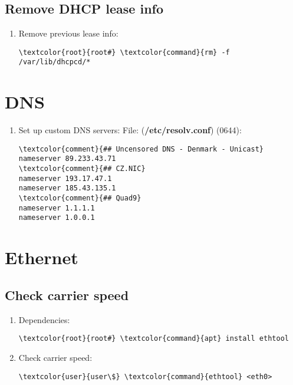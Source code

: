 \documentclass[10pt, a4paper, onecolumn, openany]{book} %
\begin{document}
\subsection{Remove DHCP lease info}
\begin{enumerate}
    \item Remove previous lease info:
\begin{Verbatim}[commandchars=\\\{\}]
\textcolor{root}{root#} \textcolor{command}{rm} -f /var/lib/dhcpcd/*
\end{Verbatim}
\end{enumerate}
\section{DNS}
\begin{enumerate}
    \item Set up custom DNS servers:
\newline File: (\textbf{\textcolor{file}{/etc/resolv.conf}}) (0644):
\begin{Verbatim}[commandchars=\\\{\}]
\textcolor{comment}{## Uncensored DNS - Denmark - Unicast}
nameserver 89.233.43.71
\textcolor{comment}{## CZ.NIC}
nameserver 193.17.47.1
nameserver 185.43.135.1
\textcolor{comment}{## Quad9}
nameserver 1.1.1.1
nameserver 1.0.0.1
\end{Verbatim}
\end{enumerate}
\section{Ethernet}
\subsection{Check carrier speed}
\begin{enumerate}
    \item Dependencies:
\begin{Verbatim}[commandchars=\\\{\}]
\textcolor{root}{root#} \textcolor{command}{apt} install ethtool
\end{Verbatim}
    \item Check carrier speed:
\begin{Verbatim}[commandchars=\\\{\}]
\textcolor{user}{user\$} \textcolor{command}{ethtool} <eth0>
\end{Verbatim}
\end{enumerate}
\end{document}
